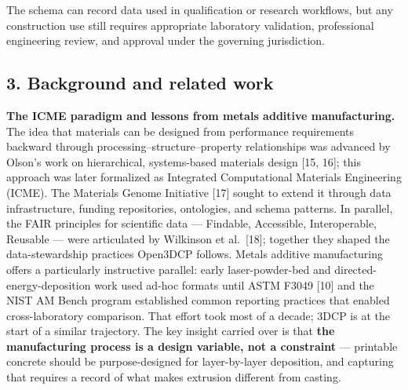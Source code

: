 \documentclass[
  11pt,
  letterpaper,
]{article}
\begin{document}
The schema can record data used in qualification or research workflows,
but any construction use still requires appropriate laboratory
validation, professional engineering review, and approval under the
governing jurisdiction.

\subsection{3. Background and related
work}\label{background-and-related-work}

\textbf{The ICME paradigm and lessons from metals additive
manufacturing.} The idea that materials can be designed from performance
requirements backward through processing--structure--property
relationships was advanced by Olson's work on hierarchical,
systems-based materials design {[}15, 16{]}; this approach was later
formalized as Integrated Computational Materials Engineering (ICME). The
Materials Genome Initiative {[}17{]} sought to extend it through data
infrastructure, funding repositories, ontologies, and schema patterns.
In parallel, the FAIR principles for scientific data --- Findable,
Accessible, Interoperable, Reusable --- were articulated by Wilkinson et
al.~{[}18{]}; together they shaped the data-stewardship practices
Open3DCP follows. Metals additive manufacturing offers a particularly
instructive parallel: early laser-powder-bed and
directed-energy-deposition work used ad-hoc formats until ASTM F3049
{[}10{]} and the NIST AM Bench program established common reporting
practices that enabled cross-laboratory comparison. That effort took
most of a decade; 3DCP is at the start of a similar trajectory. The key
insight carried over is that \textbf{the manufacturing process is a
design variable, not a constraint} --- printable concrete should be
purpose-designed for layer-by-layer deposition, and capturing that
requires a record of what makes extrusion different from casting.
\end{document}
